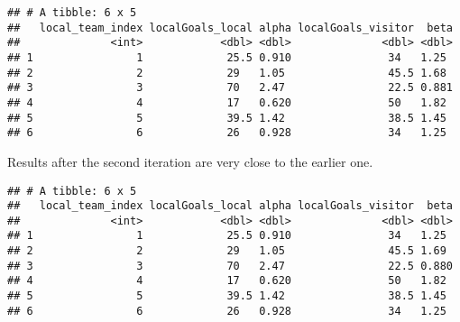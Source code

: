 \documentclass[
]{article}
\newenvironment{Shaded}{\begin{snugshade}}{\end{snugshade}}
\newcommand{\ControlFlowTok}[1]{\textcolor[rgb]{0.13,0.29,0.53}{\textbf{#1}}}
\newcommand{\DecValTok}[1]{\textcolor[rgb]{0.00,0.00,0.81}{#1}}
\newcommand{\FunctionTok}[1]{\textcolor[rgb]{0.00,0.00,0.00}{#1}}
\newcommand{\NormalTok}[1]{#1}
\newcommand{\OtherTok}[1]{\textcolor[rgb]{0.56,0.35,0.01}{#1}}
\newcommand{\SpecialCharTok}[1]{\textcolor[rgb]{0.00,0.00,0.00}{#1}}
\begin{document}
\begin{verbatim}
## # A tibble: 6 x 5
##   local_team_index localGoals_local alpha localGoals_visitor  beta
##              <int>            <dbl> <dbl>              <dbl> <dbl>
## 1                1             25.5 0.910               34   1.25 
## 2                2             29   1.05                45.5 1.68 
## 3                3             70   2.47                22.5 0.881
## 4                4             17   0.620               50   1.82 
## 5                5             39.5 1.42                38.5 1.45 
## 6                6             26   0.928               34   1.25
\end{verbatim}

Results after the second iteration are very close to the earlier one.

\begin{Shaded}
\end{Shaded}

\begin{verbatim}
## # A tibble: 6 x 5
##   local_team_index localGoals_local alpha localGoals_visitor  beta
##              <int>            <dbl> <dbl>              <dbl> <dbl>
## 1                1             25.5 0.910               34   1.25 
## 2                2             29   1.05                45.5 1.69 
## 3                3             70   2.47                22.5 0.880
## 4                4             17   0.620               50   1.82 
## 5                5             39.5 1.42                38.5 1.45 
## 6                6             26   0.928               34   1.25
\end{verbatim}
\end{document}
